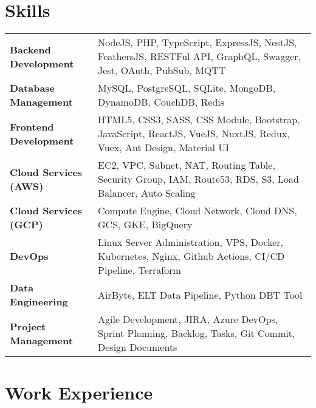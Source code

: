 \documentclass {article}
\begin{document}
\section{Skills}
\begin{tabularx}{\linewidth}{@{}l X@{}}
  \textbf{Backend Development} & NodeJS, PHP, TypeScript, ExpressJS, NestJS, FeathersJS, RESTFul API, GraphQL, Swagger, Jest, OAuth, PubSub, MQTT\\
  \textbf{Database Management} & MySQL, PostgreSQL, SQLite, MongoDB, DynamoDB, CouchDB, Redis\\ 
  \textbf{Frontend Development} & HTML5, CSS3, SASS, CSS Module, Bootstrap, JavaScript, ReactJS, VueJS, NuxtJS, Redux, Vuex, Ant Design, Material UI\\ 
  \textbf{Cloud Services (AWS)} & EC2, VPC, Subnet, NAT, Routing Table, Security Group, IAM, Route53, RDS, S3, Load Balancer, Auto Scaling\\ 
  \textbf{Cloud Services (GCP)} & Compute Engine, Cloud Network, Cloud DNS, GCS, GKE, BigQuery\\
  \textbf{DevOps} & Linux Server Administration, VPS, Docker, Kubernetes, Nginx, Github Actions, CI/CD Pipeline, Terraform\\
  \textbf{Data Engineering} & AirByte, ELT Data Pipeline, Python DBT Tool\\
  \textbf{Project Management} & Agile Development, JIRA, Azure DevOps, Sprint Planning, Backlog, Tasks, Git Commit, Design Documents\\
\end{tabularx}

\section{Work Experience}
\end{document}
